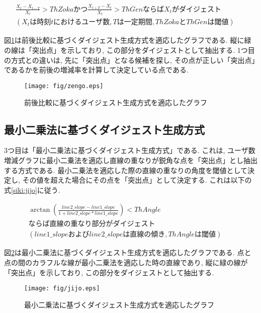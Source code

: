 \begin{eqnarray}
\frac{X_{t}-X_{t-T}}{X_{t}}>ThZokaかつ\frac{X_{t+T}-X_{t}}{X_{t}}>ThGenならばX_{t}がダイジェスト \nonumber \\
(X_{t}は時刻tにおけるユーザ数, Tは一定期間, ThZokaとThGenは閾値) &&
\label{siki:zengo}
\end{eqnarray}

図\ref{fig:zengo}は前後比較に基づくダイジェスト生成方式を適応したグラフである. 縦に緑の線は「突出点」を示しており, この部分をダイジェストとして抽出する. 1つ目の方式との違いは, 先に「突出点」となる候補を探し, その点が正しい「突出点」であるかを前後の増減率を計算して決定している点である.

\newpage

\begin{figure}[h]
  \centering
  \texttt{[image: fig/zengo.eps]}
  \caption{前後比較に基づくダイジェスト生成方式を適応したグラフ}
  \label{fig:zengo}
\end{figure}

\subsection{最小二乗法に基づくダイジェスト生成方式}
3つ目は「最小二乗法に基づくダイジェスト生成方式」である. これは, ユーザ数増減グラフに最小二乗法を適応し直線の重なりが鋭角な点を「突出点」とし抽出する方式である. 最小二乗法を適応した際の直線の重なりの角度を閾値として決定し, その値を超えた場合にその点を「突出点」として決定する. これは以下の式\ref{siki:jijo}に従う.

\begin{eqnarray}
\arctan \left(\frac{line2\_slope - line1\_slope}{1+line2\_slope*line1\_slope}\right) < ThAngle \nonumber \\
ならば直線の重なり部分がダイジェスト \nonumber \\
(line1\_slopeおよびline2\_slopeは直線の傾き, ThAngleは閾値) &&
\label{siki:jijo}
\end{eqnarray}

図\ref{fig:jijo}は最小二乗法に基づくダイジェスト生成方式を適応したグラフである. 点と点の間のカラフルな線が最小二乗法を適応した時の直線であり, 縦に緑の線が「突出点」を示しており, この部分をダイジェストとして抽出する.

\begin{figure}[h]
  \centering
  \texttt{[image: fig/jijo.eps]}
  \caption{最小二乗法に基づくダイジェスト生成方式を適応したグラフ}
  \label{fig:jijo}
\end{figure}

